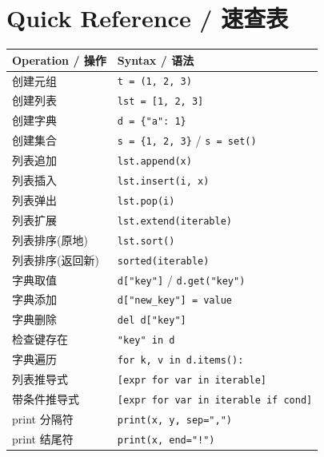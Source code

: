 \documentclass[11pt,a4paper]{article}
\begin{document}
\section{Quick Reference / 速查表}

\begin{table}[h]
\centering
\small
\renewcommand{\arraystretch}{1.3}
\begin{tabular}{@{}ll@{}}
\toprule
\textbf{Operation / 操作} & \textbf{Syntax / 语法} \\ \midrule
创建元组 & \texttt{t = (1, 2, 3)} \\
创建列表 & \texttt{lst = [1, 2, 3]} \\
创建字典 & \texttt{d = \{"a": 1\}} \\
创建集合 & \texttt{s = \{1, 2, 3\}} / \texttt{s = set()} \\
列表追加 & \texttt{lst.append(x)} \\
列表插入 & \texttt{lst.insert(i, x)} \\
列表弹出 & \texttt{lst.pop(i)} \\
列表扩展 & \texttt{lst.extend(iterable)} \\
列表排序(原地) & \texttt{lst.sort()} \\
列表排序(返回新) & \texttt{sorted(iterable)} \\
字典取值 & \texttt{d["key"]} / \texttt{d.get("key")} \\
字典添加 & \texttt{d["new\_key"] = value} \\
字典删除 & \texttt{del d["key"]} \\
检查键存在 & \texttt{"key" in d} \\
字典遍历 & \texttt{for k, v in d.items():} \\
列表推导式 & \texttt{[expr for var in iterable]} \\
带条件推导式 & \texttt{[expr for var in iterable if cond]} \\
print 分隔符 & \texttt{print(x, y, sep=",")} \\
print 结尾符 & \texttt{print(x, end="!")} \\ \bottomrule
\end{tabular}
\end{table}
\end{document}
